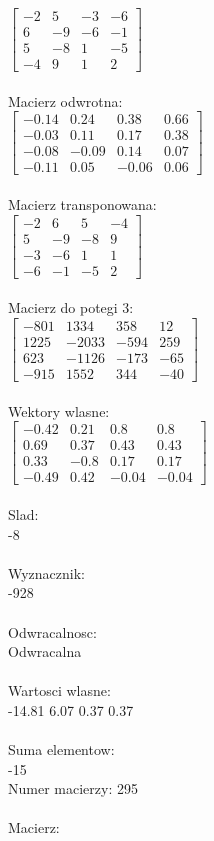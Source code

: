 \documentclass[a4paper,12pt]{article}
\begin{document}
$\begin{bmatrix} -2&5&-3&-6\\6&-9&-6&-1\\5&-8&1&-5\\-4&9&1&2 \end{bmatrix}$
\\
\\
Macierz odwrotna:\\

$\begin{bmatrix} -0.14&0.24&0.38&0.66\\-0.03&0.11&0.17&0.38\\-0.08&-0.09&0.14&0.07\\-0.11&0.05&-0.06&0.06 \end{bmatrix}$
\\
\\
Macierz transponowana:\\

$\begin{bmatrix} -2&6&5&-4\\5&-9&-8&9\\-3&-6&1&1\\-6&-1&-5&2 \end{bmatrix}$
\\
\\
Macierz do potegi 3:\\

$\begin{bmatrix} -801&1334&358&12\\1225&-2033&-594&259\\623&-1126&-173&-65\\-915&1552&344&-40 \end{bmatrix}$
\\
\\
Wektory wlasne:\\

$\begin{bmatrix} -0.42&0.21&0.8&0.8\\0.69&0.37&0.43&0.43\\0.33&-0.8&0.17&0.17\\-0.49&0.42&-0.04&-0.04 \end{bmatrix}$
\\
\\
Slad:\\
-8
\\
\\
Wyznacznik:\\
-928
\\
\\
Odwracalnosc:\\
Odwracalna
\\
\\
Wartosci wlasne:\\
-14.81 6.07 0.37 0.37
\\
\\
Suma elementow:\\
-15
\\
\newpage
Numer macierzy:
295
\\
\\
Macierz:\\
\end{document}
